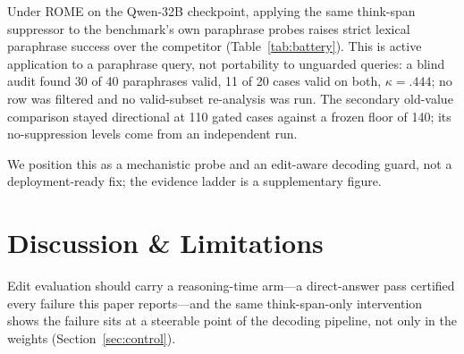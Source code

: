 \documentclass[letterpaper]{article} %
\begin{document}
Under ROME on the Qwen-32B checkpoint, applying the same think-span suppressor to the benchmark's own paraphrase probes raises strict lexical paraphrase success over the competitor (Table~\ref{tab:battery}).  This is active application to a paraphrase query, not portability to unguarded queries: a blind audit found 30 of 40 paraphrases valid, 11 of 20 cases valid on both, \(\kappa=.444\); no row was filtered and no valid-subset re-analysis was run.  The secondary old-value comparison stayed directional at 110 gated cases against a frozen floor of 140; its no-suppression levels come from an independent run. %

We position this as a mechanistic probe and an edit-aware decoding guard, not a deployment-ready fix; the evidence ladder is a supplementary figure.


\section{Discussion \& Limitations}
\label{sec:discussion}

Edit evaluation should carry a reasoning-time arm---a direct-answer pass certified every failure this paper reports---and the same think-span-only intervention shows the failure sits at a steerable point of the decoding pipeline, not only in the weights (Section~\ref{sec:control}).
\end{document}
